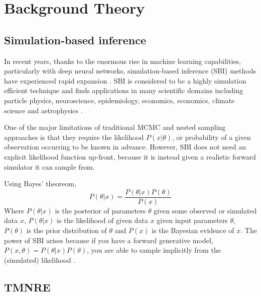 \section{Background Theory}
\label{sec:background_theory}

\subsection{Simulation-based inference}

In recent years, thanks to the enormous rise in machine learning capabilities, particularly with deep neural networks, simulation-based inference (SBI) methods have experienced rapid expansion \cite{Cranmer_SBI_2020}. SBI is considered to be a highly simulation efficient technique and finds applications in many scientific domains including particle physics, neuroscience, epidemiology, economics, economics, climate science and astrophysics \cite{Cranmer_SBI_2020}.

One of the major limitations of traditional MCMC and nested sampling approaches is that they require the likelihood $P(x|\theta)$, or probability of a given observation occurring to be known in advance. However, SBI does not need an explicit likelihood function up-front, because it is instead given a realistic forward simulator it can sample from.

Using Bayes' theoreom,
\begin{equation*}
    P(\theta|x) = \frac{P(\theta|x) P(\theta)}{P(x)}
\end{equation*}
Where $P(\theta|x)$ is the posterior of parameters $\theta$ given some observed or simulated data $x$, $P(\theta|x)$ is the likelihood of given data $x$ given input parameters $\theta$, $P(\theta)$ is the prior distribution of $\theta$ and $P(x)$ is the Bayesian evidence of $x$. The power of SBI arises because if you have a forward generative model, $P(x,\theta)=P(\theta|x) P(\theta)$, you are able to sample implicitly from the (simulated) likelihood \cite{Cranmer_SBI_2020}.

\subsection{TMNRE}

